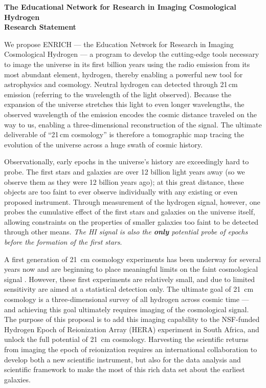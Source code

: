 \documentclass[preprint,11pt]{aastex}
\begin{document}
\setlength{\parindent}{0cm}
\textbf{\large The Educational Network for Research in Imaging Cosmological Hydrogen}\\
\textbf{Research Statement}
\vspace{6pt}
\setlength{\parindent}{17pt}

We propose ENRICH --- the Education Network for Research in Imaging Cosmological Hydrogen --- a program to develop the cutting-edge tools necessary to image the universe in its first billion years using the radio emission from its most abundant element, hydrogen, thereby enabling a powerful new tool for astrophysics and cosmology.  Neutral hydrogen can detected through 21\,cm emission (referring to the wavelength of the light observed).  Because the expansion of the universe stretches this light to even longer wavelengths, the observed wavelength of the emission encodes the cosmic distance traveled on the way to us, enabling a three-dimensional reconstruction of the signal.  The ultimate deliverable of ``21\,cm cosmology'' is therefore a tomographic map tracing the evolution of the universe across a huge swath of cosmic history.

Observationally, early epochs in the universe's history are exceedingly hard to probe. The first stars and galaxies are over 12 billion light years away (so we observe them as they were 12 billion years ago); at this great distance, these objects are too faint to ever observe individually with any existing or even proposed instrument.  Through measurement of the hydrogen signal, however, one probes the cumulative effect of the first stars and galaxies on the universe itself, allowing constraints on the properties of smaller galaxies too faint to be detected through other means.  \emph{The HI signal is also the \textbf{only} potential probe of epochs before the formation of the first stars}.

A first generation of 21\, cm cosmology experiments has been underway for several years now and are beginning to place meaningful limits on the faint cosmological signal \citep{parsons_et_al_2014,jacobs_et_al_2015,ali_et_al_2015,pober_et_al_2015}.  However, these first experiments are relatively small, and due to limited sensitivity are aimed at a statistical detection only.  The ultimate goal of 21\, cm cosmology is a three-dimensional survey of all hydrogen across cosmic time --- and achieving this goal ultimately requires imaging of the cosmological signal.  The purpose of this proposal is to add this imaging capability to the NSF-funded Hydrogen Epoch of Reionization Array (HERA) experiment in South Africa, and unlock the full potential of 21\, cm cosmology.  Harvesting the scientific returns from imaging the epoch of reionization requires an international collaboration to develop both a new scientific instrument, but also for the data analysis and scientific framework to make the most of this rich data set about the earliest galaxies.  
\end{document}
